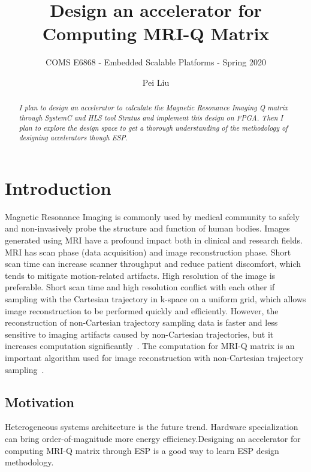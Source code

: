 \documentclass{sig-alternate}
\begin{document}
\title{\Large\bf Design an accelerator for Computing MRI-Q Matrix}
\subtitle{\normalsize COMS E6868 - Embedded Scalable Platforms - Spring 2020}

\author{
\alignauthor
Pei Liu\\
\vspace{0.2cm}
}

\vspace{-2cm}

\maketitle

\vspace{-2cm}

\begin{abstract}
{\small\em
  I plan to design an accelerator to calculate the Magnetic Resonance Imaging Q matrix through SystemC and HLS tool Stratus and implement this design on FPGA. Then I plan to explore the design space to get a thorough understanding of the methodology of designing accelerators though ESP. 
}
\end{abstract}

\section{Introduction}
\label{sec:intro}
Magnetic Resonance Imaging is commonly used by medical community to safely and non-invasively probe the structure and function of human bodies. Images generated using MRI have a profound impact both in clinical and research fields. MRI has scan phase (data acquisition) and image reconstruction phase. Short scan time can increase scanner throughput and reduce patient discomfort, which tends to mitigate motion-related artifacts. High resolution of the image is preferable. Short scan time and high resolution conflict with each other if sampling with the Cartesian trajectory in k-space on a uniform grid, which allows image reconstruction to be performed quickly and efficiently. However, the reconstruction of non-Cartesian trajectory sampling data is faster and less sensitive to imaging artifacts caused by non-Cartesian trajectories, but it increases computation significantly~\cite{stone2008accelerating}. The computation for MRI-Q matrix is an important algorithm used for image reconstruction with non-Cartesian trajectory sampling~\cite{stratton2012parboil}.

\subsection{Motivation}
Heterogeneous systems architecture is the future trend. Hardware specialization can bring order-of-magnitude more energy efficiency.Designing an accelerator for computing MRI-Q matrix through ESP is a good way to learn ESP design methodology.
\end{document}
